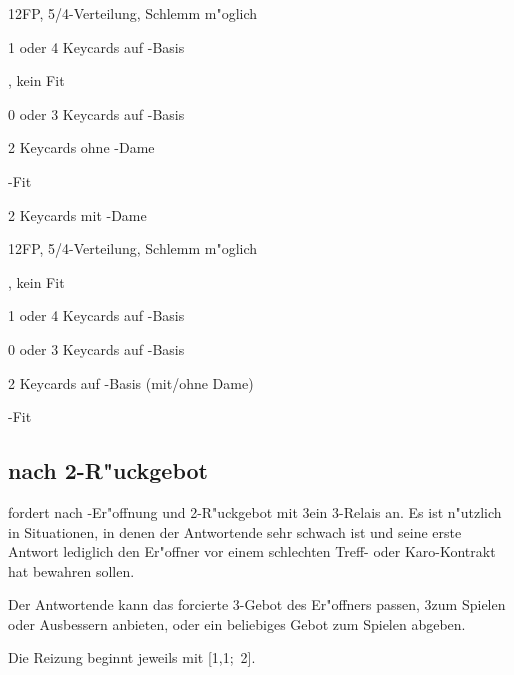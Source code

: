   \bdsc
      \item[3\coe] 12\pl FP, 5/4-Verteilung, Schlemm m"oglich
        \bdsc
          \item[3\pik] 1 oder 4 Keycards auf \ka-Basis
          \item[3\SA] \nat, kein Fit
          \item[4\tre] 0 oder 3 Keycards auf \ka-Basis
          \item[4\kar] 2 Keycards ohne \ka-Dame
          \item[4\coe] \co-Fit
          \item[4\pik] 2 Keycards mit \ka-Dame
        \edsc
      \item[3\pik] 12\pl FP, 5/4-Verteilung, Schlemm m"oglich
        \bdsc
          \item[3\SA] \nat, kein Fit
          \item[4\tre] 1 oder 4 Keycards auf \ka-Basis
          \item[4\kar] 0 oder 3 Keycards auf \ka-Basis
          \item[4\coe] 2 Keycards auf \ka-Basis (mit/ohne Dame)
          \item[4\pik] \pi-Fit
        \edsc
    \edsc
\edsc

\subsection{ nach 2\SA-R"uckgebot} \label{wolff}

 fordert nach \ufa-Er"offnung und 2\SA-R"uckgebot mit
3\tre ein 3\kar-Relais an. Es ist n"utzlich in Situationen, in denen der
Antwortende sehr schwach ist und seine erste Antwort lediglich den
Er"offner vor einem schlechten Treff- oder Karo-Kontrakt hat bewahren
sollen. \cite{cuppaidge05}

Der Antwortende kann das forcierte 3\kar-Gebot des Er"offners passen,
3\coe zum Spielen oder Ausbessern anbieten, oder ein beliebiges Gebot
zum Spielen abgeben.


Die Reizung beginnt jeweils mit [1\tre{}\sep1\pik;~2\SA{}].



